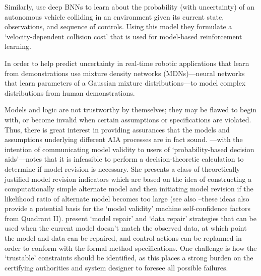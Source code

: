 Similarly, \citet{Kahn2017-vy} use deep BNNs to learn about the probability (with uncertainty) of an autonomous vehicle colliding in an environment given its current state, observations, and sequence of controls. Using this model they formulate a `velocity-dependent collision cost' that is used for model-based reinforcement learning.

In order to help predict uncertainty in real-time robotic applications that learn from demonstrations \citet{Choi2017-th} use mixture density networks (MDNs)---neural networks that learn parameters of a Gaussian mixture distributions---to model complex distributions from human demonstrations.

Models and logic are not trustworthy by themselves; they may be flawed to begin with, or become invalid when certain assumptions or specifications are violated. Thus, there is great interest in providing assurances that the models and assumptions underlying different AIA processes are in fact sound. \citet{Laskey1991-mf}---with the intention of communicating model validity to users of `probability-based decision aids'---notes that it is infeasible to perform a decision-theoretic calculation to determine if model revision is necessary. She presents a class of theoretically justified model revision indicators which are based on the idea of constructing a computationally simple alternate model and then initiating model revision if the likelihood ratio of alternate model becomes too large (see also \citet{Zagorecki2015-qy,Habbema1976-xd} --these ideas also provide a potential basis for the `model validity' machine self-confidence factors from Quadrant II). \citet{Ghosh2016-dl}  present `model repair' and `data repair' strategies that can be used when the current model doesn't match the observed data, at which point the model and data can be repaired, and control actions can be replanned in order to conform with the formal method specifications. One challenge is how the `trustable' constraints should be identified, as this places a strong burden on the certifying authorities and system designer to foresee all possible failures.
